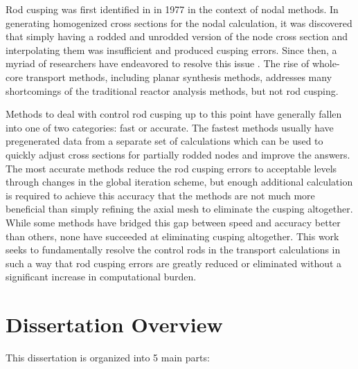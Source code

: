 Rod cusping was first identified in \cite{finnemann1977RodCuspingOrigMention} in 1977 in the context of nodal methods.  In generating homogenized cross sections for the nodal calculation, it was discovered that simply having a rodded and unrodded version of the node cross section and interpolating them was insufficient and produced cusping errors.  Since then, a myriad of researchers have endeavored to resolve this issue \cite{hoxieThesis1982application,khalilThesis1983application,chengThesis1981homogenizationResponseMatrix,finckThesis1982homogenizationResponseMatrix,bennewitz1975higher,finnemann1981space,langenbuch1977coarse,HanSemJooThesis1984,gehinThesis1992quasi,smith1992enhancementsStudxvickCoreManagementSystem,lee1998CuspingCorrection1DFineMeshFluxProfiles,downar2004PARCStheory,kim1990BilinearWeighting,de2012NEMmodification,martinez1999NEMmodOrig,dall2002nodeEquivalenceDecusping,yamamoto2004pinByPinNodalDecusping,yu2015CIAMArodDecusping,lu2015CIAMAintro,cho2015CRX2d1dFusionDecusping,ICAPPcontrolRodDecuspingNTRACER,Ryu2017nTRACERWholeCoreTransportSolutionstoC5G7-TDBenchmark}.  The rise of whole-core transport methods, including planar synthesis methods, addresses many shortcomings of the traditional reactor analysis methods, but not rod cusping.

Methods to deal with control rod cusping up to this point have generally fallen into one of two categories: fast or accurate.  The fastest methods usually have pregenerated data from a separate set of calculations which can be used to quickly adjust cross sections for partially rodded nodes and improve the answers.  The most accurate methods reduce the rod cusping errors to acceptable levels through changes in the global iteration scheme, but enough additional calculation is required to achieve this accuracy that the methods are not much more beneficial than simply refining the axial mesh to eliminate the cusping altogether.  While some methods have bridged this gap between speed and accuracy better than others, none have succeeded at eliminating cusping altogether.  This work seeks to fundamentally resolve the control rods in the transport calculations in such a way that rod cusping errors are greatly reduced or eliminated without a significant increase in computational burden.

\section{Dissertation Overview}

This dissertation is organized into 5 main parts:

